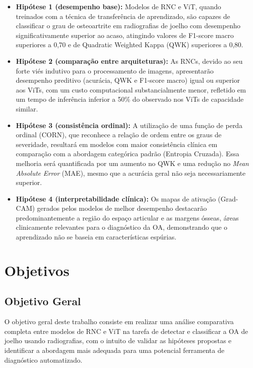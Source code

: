 \begin{itemize}
    \item \textbf{Hipótese 1 (desempenho base):} Modelos de RNC e ViT, quando treinados com a técnica de transferência de aprendizado, são capazes de classificar o grau de osteoartrite em radiografias de joelho com desempenho significativamente superior ao acaso, atingindo valores de F1-score macro superiores a 0,70 e de Quadratic Weighted Kappa (QWK) superiores a 0,80.

    \item \textbf{Hipótese 2 (comparação entre arquiteturas):} As RNCs, devido ao seu forte viés indutivo para o processamento de imagens, apresentarão desempenho preditivo (acurácia, QWK e F1-score macro) igual ou superior aos ViTs, com um custo computacional substancialmente menor, refletido em um tempo de inferência inferior a 50\% do observado nos ViTs de capacidade similar.
    
    \item \textbf{Hipótese 3 (consistência ordinal):} A utilização de uma função de perda ordinal (CORN), que reconhece a relação de ordem entre os graus de severidade, resultará em modelos com maior consistência clínica em comparação com a abordagem categórica padrão (Entropia Cruzada). Essa melhoria será quantificada por um aumento no QWK e uma redução no \textit{Mean Absolute Error} (MAE), mesmo que a acurácia geral não seja necessariamente superior.

    \item \textbf{Hipótese 4 (interpretabilidade clínica):} Os mapas de ativação (Grad-CAM) gerados pelos modelos de melhor desempenho destacarão predominantemente a região do espaço articular e as margens ósseas, áreas clinicamente relevantes para o diagnóstico da OA, demonstrando que o aprendizado não se baseia em características espúrias.
\end{itemize}

\section{Objetivos}

\subsection{Objetivo Geral}

O objetivo geral deste trabalho consiste em realizar uma análise comparativa completa entre modelos de RNC e ViT na tarefa de detectar e classificar a OA de joelho usando radiografias, com o intuito de validar as hipóteses propostas e identificar a abordagem mais adequada para uma potencial ferramenta de diagnóstico automatizado.

